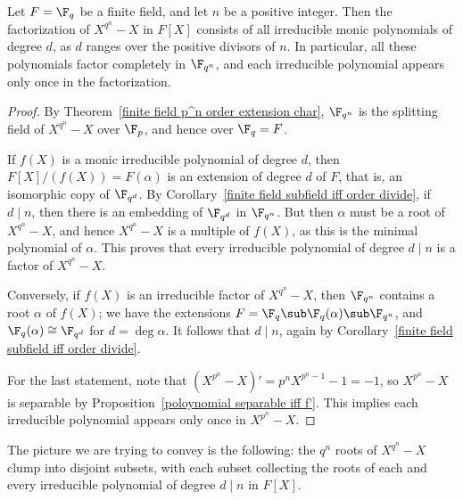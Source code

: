 \begin{corollary}
Let $F=\F_q$ be a finite field, and let $n$ be a positive integer. Then the factorization of $X^{q^n}-X$ in $F[X]$ consists of all irreducible monic polynomials of degree $d$, as $d$ ranges over the positive divisors of $n$. In particular, all these polynomials factor completely in $\F_{q^n}$, and each irreducible polynomial appears only once in the factorization.
\end{corollary}
\begin{proof}
By Theorem~\ref{finite field p^n order extension char}, $\F_{q^n}$ is the splitting field of $X^{q^n}-X$ over $\F_p$, and hence over $\F_q=F$.\par
If $f(X)$ is a monic irreducible polynomial of degree $d$, then $F[X]/(f(X))=F(\alpha)$ is an extension of degree $d$ of $F$, that is, an isomorphic copy of $\F_{q^d}$. By Corollary~\ref{finite field subfield iff order divide}, if $d\mid n$, then there is an embedding of $\F_{q^d}$ in $\F_{q^n}$. But then $\alpha$ must be a root of $X^{q^n}-X$, and hence $X^{q^n}-X$ is a multiple of $f(X)$, as this is the minimal polynomial of $\alpha$. This proves that every irreducible polynomial of degree $d\mid n$ is a factor of $X^{q^n}-X$.\par
Conversely, if $f(X)$ is an irreducible factor of $X^{q^n}-X$, then $\F_{q^n}$ contains a root $\alpha$ of $f(X)$; we have the extensions $F=\F_q\sub\F_q(\alpha)\sub\F_{q^n}$, and $\F_q(\alpha)\cong\F_{q^d}$ for $d=\deg\alpha$. It follows that $d\mid n$, again by Corollary~\ref{finite field subfield iff order divide}.\par
For the last statement, note that $(X^{p^n}-X)'=p^nX^{p^n-1}-1=-1$, so $X^{p^n}-X$ is separable by Proposition~\ref{poloynomial separable iff f'}. This implies each irreducible polynomial appears only once in $X^{p^n}-X$.
\end{proof}
The picture we are trying to convey is the following: the $q^n$ roots of $X^{q^n}-X$ clump into disjoint subsets, with each subset collecting the roots of each and every irreducible polynomial of degree $d\mid n$ in $F[X]$.
